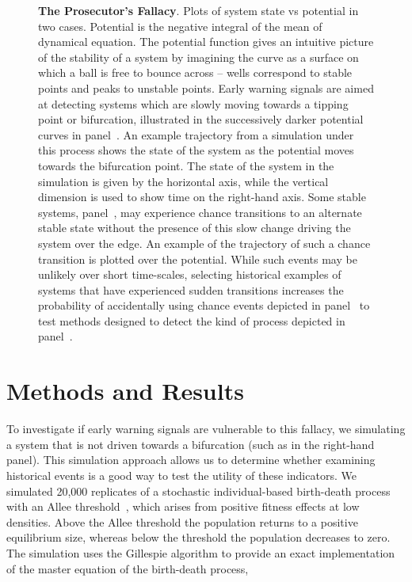 \documentclass[authoryear,5p]{elsarticle}
\begin{document}
\begin{figure}
  \begin{center}
     
  \end{center} \caption{\textbf{The Prosecutor's Fallacy}. Plots of system
  state vs potential in two cases.  Potential is the negative integral
  of the mean of dynamical equation.  The potential function gives an
  intuitive picture of the stability of a system by imagining the curve as
  a surface on which a ball is free to bounce across -- wells correspond
  to stable points and peaks to unstable points.  Early warning signals
  are aimed at detecting systems which are slowly moving towards a tipping
  point or bifurcation, illustrated in the successively darker potential
  curves in panel~.  An example trajectory from
  a simulation under this process shows the state of the system as the
  potential moves towards the bifurcation point. The state of the system
  in the simulation is given by the horizontal axis, while the vertical
  dimension is used to show time on the right-hand axis.  Some stable
  systems, panel~, may experience chance transitions
  to an alternate stable state without the presence of this slow change
  driving the system over the edge.  An example of the trajectory of
  such a chance transition is plotted over the potential.  While such
  events may be unlikely over short time-scales, selecting historical
  examples of systems that have experienced sudden transitions increases
  the probability of accidentally using chance events depicted in
  panel~ to test methods designed to detect the kind
  of process depicted in panel~.} \label{fig:1}
\end{figure}




\section{Methods and Results}
To investigate if early warning signals are vulnerable to this fallacy,
we simulating a system that is not driven towards a bifurcation (such as
in the right-hand panel).  This simulation approach allows us to determine whether
examining historical events is a good way to test the utility of these
indicators.  We simulated 20,000 replicates of a stochastic individual-based
birth-death process with an Allee threshold~\citep{Courchamp2008}, which
arises from positive fitness effects at low densities.  Above the Allee
threshold the population returns to a positive equilibrium size, whereas
below the threshold the population decreases to zero. The
simulation uses the Gillespie algorithm to provide an exact implementation
of the master equation of the birth-death process,
\end{document}
